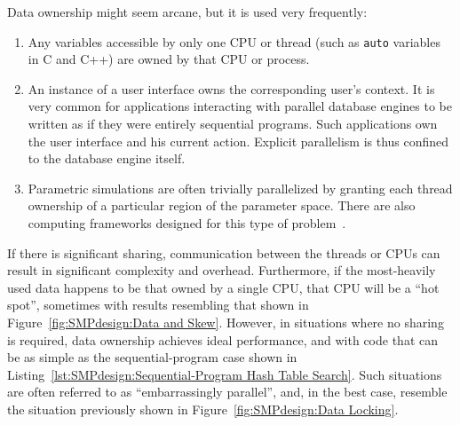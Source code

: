 Data ownership might seem arcane, but it is used very frequently:
\begin{enumerate}
\item	Any variables accessible by only one CPU or thread
	(such as {\tt auto} variables in C
	and C++) are owned by that CPU or process.
\item	An instance of a user interface owns the corresponding
	user's context.  It is very common for applications
	interacting with parallel database engines to be
	written as if they were entirely sequential programs.
	Such applications own the user interface and his current
	action.  Explicit parallelism is thus confined to the
	database engine itself.
\item	Parametric simulations are often trivially parallelized
	by granting each thread ownership of a particular region
	of the parameter space.
	There are also computing frameworks designed for this
	type of problem~\cite{BOINC2008}.
\end{enumerate}

If there is significant sharing, communication between the threads
or CPUs can result in significant complexity and overhead.
Furthermore, if the most-heavily used data happens to be that owned
by a single CPU, that CPU will be a ``hot spot'', sometimes with
results resembling that shown in Figure~\ref{fig:SMPdesign:Data and Skew}.
However, in situations where no sharing is required, data ownership
achieves ideal performance, and with code that can be as simple
as the sequential-program case shown in
Listing~\ref{lst:SMPdesign:Sequential-Program Hash Table Search}.
Such situations are often referred to as ``embarrassingly
parallel'', and, in the best case, resemble the situation
previously shown in Figure~\ref{fig:SMPdesign:Data Locking}.



